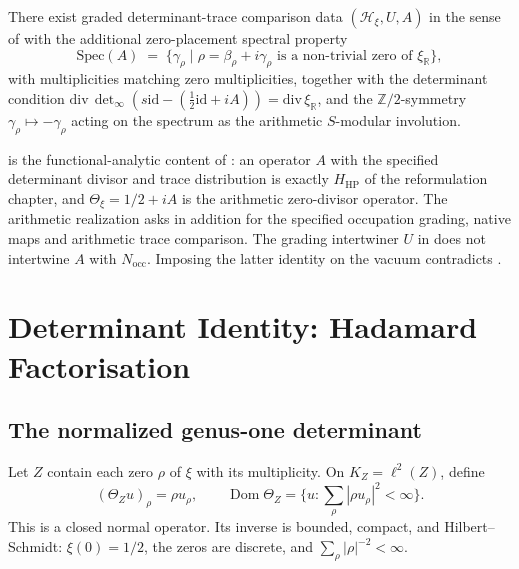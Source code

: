 \begin{hypothesis}
\label{v4-arith:w5-b:hyp:twist-existence}
There exist graded determinant-trace comparison data \((\mathcal{H}_{\xi},U,A)\) in
the sense of  with the additional
zero-placement spectral property
\begin{equation}
\label{v4-arith:w5-b:eq:spec-A}
\mathrm{Spec}(A)\;=\;\{\gamma_{\rho}\mid\rho=\beta_{\rho}+i\gamma_{\rho}
\text{ is a non-trivial zero of }\xi_{\mathbb R}\},
\end{equation}
with multiplicities matching zero multiplicities, together with the
determinant condition
\(\mathrm{div}\,\det_{\infty}(s\mathrm{id}-(\tfrac12\mathrm{id}+iA))
=\mathrm{div}\,\xi_{\mathbb R}\), and the
\(\mathbb{Z}/2\)-symmetry \(\gamma_{\rho}\mapsto-\gamma_{\rho}\) acting on
the spectrum as the arithmetic \(S\)-modular involution.
\end{hypothesis}

\begin{remark}
\label{v4-arith:w5-b:rem:equals-HPAr}
 is the functional-analytic
content of : an operator \(A\) with the
specified determinant divisor and trace distribution is exactly
\(H_{\mathrm{HP}}\) of the reformulation chapter, and
\(\Theta_{\xi}=1/2+iA\) is the arithmetic zero-divisor operator.
The arithmetic realization asks in addition for the specified occupation
grading, native maps and arithmetic trace comparison. The grading
intertwiner \(U\) in  does not intertwine
\(A\) with \(N_{\mathrm{occ}}\). Imposing the latter identity on the
vacuum contradicts .
\end{remark}

\section{Determinant Identity: Hadamard Factorisation}
\label{v4-arith:w5-b:determinant}

\subsection{The normalized genus-one determinant}
\label{v4-arith:sc:determinant}

Let $Z$ contain each zero $\rho$ of $\xi$ with its multiplicity.
On $K_Z=\ell^2(Z)$, define
\[
 (\Theta_Zu)_\rho=\rho u_\rho,\qquad
 \operatorname{Dom}\Theta_Z=\{u:\sum_\rho|\rho u_\rho|^2<\infty\}.
\]
This is a closed normal operator. Its inverse is bounded, compact,
and Hilbert--Schmidt: $\xi(0)=1/2$, the zeros are discrete, and
$\sum_\rho|\rho|^{-2}<\infty$.

